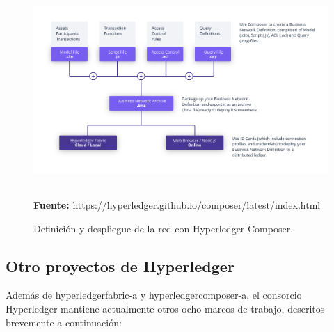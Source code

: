 \documentclass[12pt,a4paper, twoside]{report}
\begin{document}
	\begin{figure}[!ht]   
		\caption{Definición y despliegue de la red con Hyperledger Composer.} 
		\begin{center} 
			\includegraphics[width=17cm,height=8cm]{Images/stateArt/hc} \\
			\label{fig:stateArt_hyperledgercomposer} 
			\textbf{Fuente:} \url{https://hyperledger.github.io/composer/latest/index.html}
		\end{center}  
	\end{figure}
	
	\subsection{Otro proyectos de Hyperledger}

	Además de \gls{hyperledgerfabric-a} y \gls{hyperledgercomposer-a}, el consorcio Hyperledger mantiene actualmente otros ocho marcos de trabajo, descritos brevemente a continuación:
	
\end{document}
